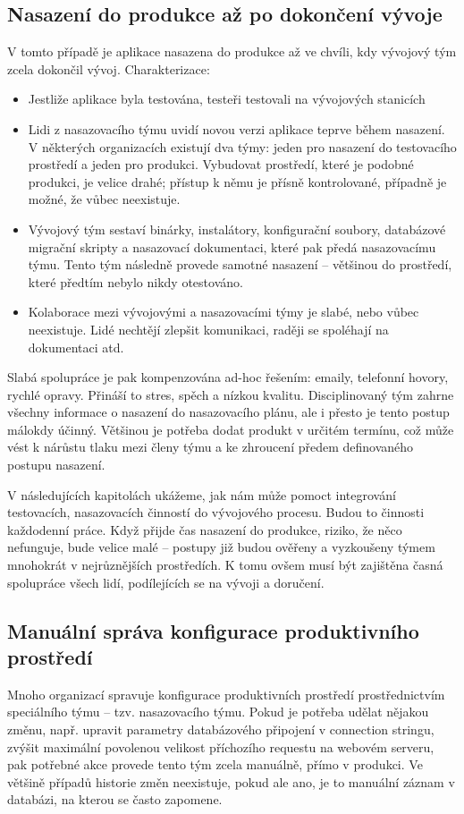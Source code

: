 \subsection{Nasazení do produkce až po dokončení vývoje}
V tomto případě je aplikace nasazena do produkce až ve chvíli, kdy vývojový tým zcela dokončil vývoj. Charakterizace:

\begin{itemize}
  \item Jestliže aplikace byla testována, testeři testovali na vývojových stanicích
  \item Lidi z nasazovacího týmu uvidí novou verzi aplikace teprve během nasazení. V některých organizacích existují dva týmy: jeden pro nasazení do testovacího prostředí a jeden pro produkci. Vybudovat prostředí, které je podobné produkci, je velice drahé; přístup k němu je přísně kontrolované, případně je možné, že vůbec neexistuje.
  \item Vývojový tým sestaví binárky, instalátory, konfigurační soubory, databázové migrační skripty a nasazovací dokumentaci, které pak předá nasazovacímu týmu. Tento tým následně provede samotné nasazení -- většinou do prostředí, které předtím nebylo nikdy otestováno.  
  \item Kolaborace mezi vývojovými a nasazovacími týmy je slabé, nebo vůbec neexistuje. Lidé nechtějí zlepšit komunikaci, raději se spoléhají na dokumentaci atd.
\end{itemize}

Slabá spolupráce je pak kompenzována ad-hoc řešením: emaily, telefonní hovory, rychlé opravy. Přináší to stres, spěch a nízkou kvalitu. Disciplinovaný tým zahrne všechny informace o nasazení do nasazovacího plánu, ale i přesto je tento postup málokdy účinný. Většinou je potřeba dodat produkt v určitém termínu, což může vést k nárůstu tlaku mezi členy týmu a ke zhroucení předem definovaného postupu nasazení. 

V následujících kapitolách ukážeme, jak nám může pomoct integrování testovacích, nasazovacích činností do vývojového procesu. Budou to činnosti každodenní práce. Když přijde čas nasazení do produkce, riziko, že něco nefunguje, bude velice malé -- postupy již budou ověřeny a vyzkoušeny týmem mnohokrát v nejrůznějších prostředích. K tomu ovšem musí být zajištěna časná spolupráce všech lidí, podílejících se na vývoji a doručení.

\subsection{Manuální správa konfigurace produktivního prostředí}
Mnoho organizací spravuje konfigurace produktivních prostředí prostřednictvím speciálního týmu -- tzv. nasazovacího týmu. Pokud je potřeba udělat nějakou změnu, např. upravit parametry databázového připojení v connection stringu, zvýšit maximální povolenou velikost příchozího requestu na webovém serveru, pak potřebné akce provede tento tým zcela manuálně, přímo v produkci. Ve většině případů historie změn neexistuje, pokud ale ano, je to manuální záznam v databázi, na kterou se často zapomene.

